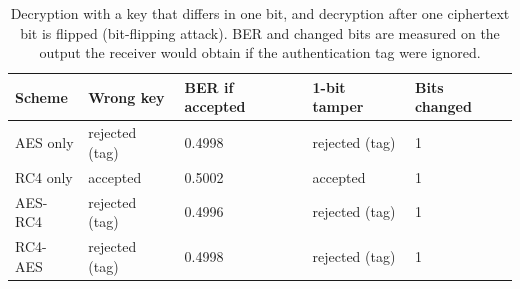 \begin{table}[htbp]
\centering
\caption{Decryption with a key that differs in one bit, and decryption after one ciphertext bit is flipped (bit-flipping attack). BER and changed bits are measured on the output the receiver would obtain if the authentication tag were ignored.}
\label{tab:p3_integrity}
\small
\begin{tabular}{lllll}
\toprule
\textbf{Scheme} & \textbf{Wrong key} & \textbf{BER if accepted} & \textbf{1-bit tamper} & \textbf{Bits changed} \\
\midrule
AES only & rejected (tag) & 0.4998 & rejected (tag) & 1 \\
RC4 only & accepted & 0.5002 & accepted & 1 \\
AES-RC4 & rejected (tag) & 0.4996 & rejected (tag) & 1 \\
RC4-AES & rejected (tag) & 0.4998 & rejected (tag) & 1 \\
\bottomrule
\end{tabular}
\end{table}
